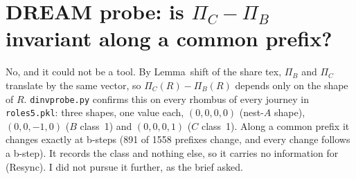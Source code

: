 \documentclass[11pt]{article}
\theoremstyle{definition}\newtheorem{definition}[theorem]{Definition}\newtheorem{remark}[theorem]{Remark}
\begin{document}
\section{DREAM probe: is $\Pi_C-\Pi_B$ invariant along a common prefix?}
No, and it could not be a tool. By Lemma~shift of the share tex, $\Pi_B$ and $\Pi_C$ translate by the same vector, so $\Pi_C(R)-\Pi_B(R)$ depends only on the shape of $R$. \texttt{dinvprobe.py} confirms this on every rhombus of every journey in \texttt{roles5.pkl}: three shapes, one value each, $(0,0,0,0)$ (nest-$A$ shape), $(0,0,-1,0)$ ($B$ class~1) and $(0,0,0,1)$ ($C$ class~1). Along a common prefix it changes exactly at b-steps (891 of 1558 prefixes change, and every change follows a b-step). It records the class and nothing else, so it carries no information for (Resync). I did not pursue it further, as the brief asked.
\end{document}
